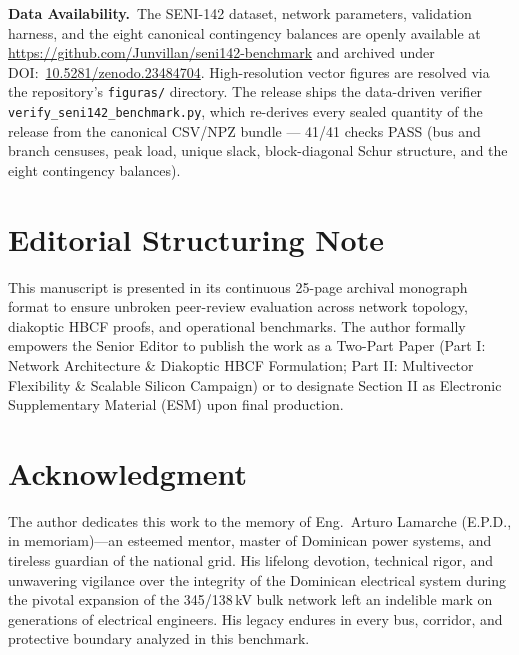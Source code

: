 \documentclass[11pt, journal, onecolumn]{IEEEtran}
\begin{document}








\noindent\textbf{Data Availability.}~The SENI-142 dataset, network parameters, validation harness, and the eight canonical contingency balances are openly available at \url{https://github.com/Junvillan/seni142-benchmark} and archived under DOI:~\href{https://doi.org/10.5281/zenodo.23484704}{10.5281/zenodo.23484704}. High-resolution vector figures are resolved via the repository's \texttt{figuras/} directory. The release ships the data-driven verifier \texttt{verify\_seni142\_benchmark.py}, which re-derives every sealed quantity of the release from the canonical CSV/NPZ bundle --- 41/41 checks PASS (bus and branch censuses, peak load, unique slack, block-diagonal Schur structure, and the eight contingency balances).

\section*{Editorial Structuring Note}
This manuscript is presented in its continuous 25-page archival monograph format to ensure unbroken peer-review evaluation across network topology, diakoptic HBCF proofs, and operational benchmarks. The author formally empowers the Senior Editor to publish the work as a Two-Part Paper (Part I: Network Architecture \& Diakoptic HBCF Formulation; Part II: Multivector Flexibility \& Scalable Silicon Campaign) or to designate Section II as Electronic Supplementary Material (ESM) upon final production.

\section*{Acknowledgment}
The author dedicates this work to the memory of Eng.~Arturo Lamarche (E.P.D., in memoriam)---an esteemed mentor, master of Dominican power systems, and tireless guardian of the national grid. His lifelong devotion, technical rigor, and unwavering vigilance over the integrity of the Dominican electrical system during the pivotal expansion of the 345/138\,kV bulk network left an indelible mark on generations of electrical engineers. His legacy endures in every bus, corridor, and protective boundary analyzed in this benchmark.



\end{document}

